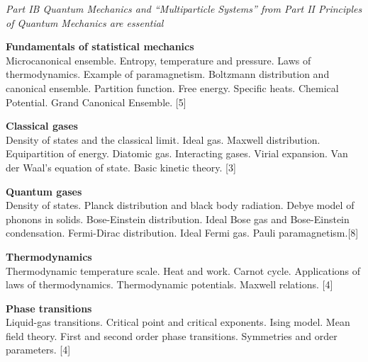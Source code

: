 \documentclass[a4paper]{article}
\begin{document}
\maketitle
{\small
  \noindent\emph{Part IB Quantum Mechanics and ``Multiparticle Systems'' from Part II Principles of Quantum Mechanics are essential}

  \vspace{10pt}
  \noindent\textbf{Fundamentals of statistical mechanics}\\
  Microcanonical ensemble. Entropy, temperature and pressure. Laws of thermodynamics. Example of paramagnetism. Boltzmann distribution and canonical ensemble. Partition function. Free energy. Specific heats. Chemical Potential. Grand Canonical Ensemble.\hspace*{\fill} [5]

  \vspace{10pt}
  \noindent\textbf{Classical gases}\\
  Density of states and the classical limit. Ideal gas. Maxwell distribution. Equipartition of energy. Diatomic gas. Interacting gases. Virial expansion. Van der Waal's equation of state. Basic kinetic theory.\hspace*{\fill} [3]

  \vspace{10pt}
  \noindent\textbf{Quantum gases}\\
  Density of states. Planck distribution and black body radiation. Debye model of phonons in solids. Bose-Einstein distribution. Ideal Bose gas and Bose-Einstein condensation. Fermi-Dirac distribution. Ideal Fermi gas. Pauli paramagnetism.\hspace*{\fill}[8]

  \vspace{10pt}
  \noindent\textbf{Thermodynamics}\\
  Thermodynamic temperature scale. Heat and work. Carnot cycle. Applications of laws of thermodynamics. Thermodynamic potentials. Maxwell relations.\hspace*{\fill} [4]

  \vspace{10pt}
  \noindent\textbf{Phase transitions}\\
  Liquid-gas transitions. Critical point and critical exponents. Ising model. Mean field theory. First and second order phase transitions. Symmetries and order parameters.\hspace*{\fill} [4]%
}

\tableofcontents
\setcounter{section}{-1}
\end{document}
